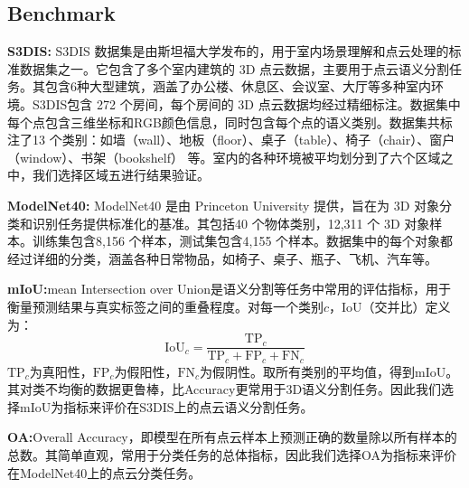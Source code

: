 \documentclass[preprint,12pt]{elsarticle}
\begin{document}
\subsection{Benchmark}
\textbf{S3DIS:}
S3DIS 数据集是由斯坦福大学发布的，用于室内场景理解和点云处理的标准数据集之一。它包含了多个室内建筑的 3D 点云数据，主要用于点云语义分割任务。其包含6种大型建筑，涵盖了办公楼、休息区、会议室、大厅等多种室内环境。S3DIS包含 272 个房间，每个房间的 3D 点云数据均经过精细标注。数据集中每个点包含三维坐标和RGB颜色信息，同时包含每个点的语义类别。数据集共标注了13 个类别：如墙（wall）、地板（floor）、桌子（table）、椅子（chair）、窗户（window）、书架（bookshelf） 等。室内的各种环境被平均划分到了六个区域之中，我们选择区域五进行结果验证。


\textbf{ModelNet40:}
ModelNet40 是由 Princeton University 提供，旨在为 3D 对象分类和识别任务提供标准化的基准。其包括40 个物体类别，12,311 个 3D 对象样本。训练集包含8,156 个样本，测试集包含4,155 个样本。数据集中的每个对象都经过详细的分类，涵盖各种日常物品，如椅子、桌子、瓶子、飞机、汽车等。


\textbf{mIoU:}mean Intersection over Union是语义分割等任务中常用的评估指标，用于衡量预测结果与真实标签之间的重叠程度。对每一个类别$c$，IoU（交并比）定义为：\begin{equation}\mathrm{IoU}_c=\frac{\mathrm{TP}_c}{\mathrm{TP}_c+\mathrm{FP}_c+\mathrm{FN}_c}\end{equation}
$\mathrm{TP}_{c}$为真阳性，$\mathrm{FP}_{c}$为假阳性，$\mathrm{FN}_{c}$为假阴性。取所有类别的平均值，得到mIoU。其对类不均衡的数据更鲁棒，比Accuracy更常用于3D语义分割任务。因此我们选择mIoU为指标来评价在S3DIS上的点云语义分割任务。

\textbf{OA:}Overall Accuracy，即模型在所有点云样本上预测正确的数量除以所有样本的总数。其简单直观，常用于分类任务的总体指标，因此我们选择OA为指标来评价在ModelNet40上的点云分类任务。
\end{document}
